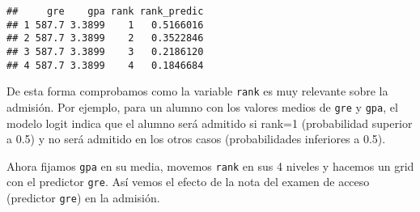 \documentclass[
]{article}
\newenvironment{Shaded}{\begin{snugshade}}{\end{snugshade}}
\newcommand{\AttributeTok}[1]{\textcolor[rgb]{0.13,0.29,0.53}{#1}}
\newcommand{\DecValTok}[1]{\textcolor[rgb]{0.00,0.00,0.81}{#1}}
\newcommand{\FunctionTok}[1]{\textcolor[rgb]{0.13,0.29,0.53}{\textbf{#1}}}
\newcommand{\NormalTok}[1]{#1}
\newcommand{\OtherTok}[1]{\textcolor[rgb]{0.56,0.35,0.01}{#1}}
\newcommand{\SpecialCharTok}[1]{\textcolor[rgb]{0.81,0.36,0.00}{\textbf{#1}}}
\newcommand{\StringTok}[1]{\textcolor[rgb]{0.31,0.60,0.02}{#1}}
\begin{document}
\begin{verbatim}
##     gre    gpa rank rank_predic
## 1 587.7 3.3899    1   0.5166016
## 2 587.7 3.3899    2   0.3522846
## 3 587.7 3.3899    3   0.2186120
## 4 587.7 3.3899    4   0.1846684
\end{verbatim}

De esta forma comprobamos como la variable \texttt{rank} es muy
relevante sobre la admisión. Por ejemplo, para un alumno con los valores
medios de \texttt{gre} y \texttt{gpa}, el modelo logit indica que el
alumno será admitido si rank=1 (probabilidad superior a 0.5) y no será
admitido en los otros casos (probabilidades inferiores a 0.5).

Ahora fijamos \texttt{gpa} en su media, movemos \texttt{rank} en sus 4
niveles y hacemos un grid con el predictor \texttt{gre}. Así vemos el
efecto de la nota del examen de acceso (predictor \texttt{gre}) en la
admisión.

\begin{Shaded}
\end{Shaded}
\end{document}
